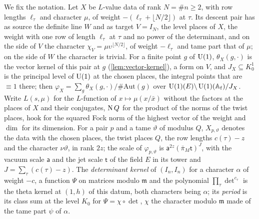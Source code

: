 We fix the notation. Let $X$ be $L$-value data of rank $N=\#n\ge2$, with row lengths $\ell_\tau$ and character $\mu$, of weight $-(\ell_\tau+\lfloor N/2\rfloor)$ at $\tau$. Its descent pair has as source the definite line $W$ and as
target $V=I_N$, the level places of $X$, the weight with one row of length $\ell_\tau$ at $\tau$ and no power of the determinant, and on the side of $V$ the character $\chi_V=\mu\upsilon^{\lfloor N/2\rfloor}$, of weight
$-\ell_\tau$ and tame part that of $\mu$; on the side of $W$ the character is trivial. For a finite point $g$ of $\operatorname{U}(1)$, $\theta_X(g,\cdot)$ is the vector kernel of this pair at $g$ (\cref{lem:vector-kernel}), a form on $V$, and
$J_X\subseteq K_0^1$ is the principal level of $\operatorname{U}(1)$ at the chosen places, the integral points that are $\equiv1$ there; then $\varphi_X=\sum_g\theta_X(g,\cdot)/\#\mathrm{Aut}(g)$ over $\operatorname{U}(1)(E)\backslash\operatorname{U}(1)(\mathbb{A}_{\rm f})/J_X$. Write $L(s,\mu)$ for the
$L$-function of $x\mapsto\mu(x/\bar x)$ without the factors at the places of $X$ and their conjugates, $\operatorname{N} Q$ for the product of the norms of the twist places, $\mathrm{hook}$ for the squared Fock norm of the highest vector of
the weight and $\dim$ for its dimension. For a pair $p$ and a tame $\vartheta$ of modulus $Q$, $X_{p,\vartheta}$ denotes the data with the chosen places, the twist places $Q$, the row lengths $c(\tau)-z$ and the character
$\nu\vartheta$, in rank $2z$; the scale of $\varphi_{p,\vartheta}$ is $\mathsf a^{2z}(\bar\pi_M\mathsf t)^{J}$, with the vacuum scale $\mathsf a$ and the jet scale $\mathsf t$ of the field $E$ in its tower and $J=\sum_\tau(c(\tau)-z)$.
The \emph{determinant kernel} of $(I_n,I_n)$ for a character $\alpha$ of weight $-c$, a function $\Psi$ on matrices modulo $\mathfrak m$ and the polynomial $\prod_\tau\det^{c_\tau}$ is the theta kernel at $(1,h)$ of this datum, both characters
being $\alpha$; its \emph{period} is its class sum at the level $K_0$ for $\Psi=\chi\circ\det$, $\chi$ the character modulo $\mathfrak m$ made of the tame part $\psi$ of $\alpha$.

